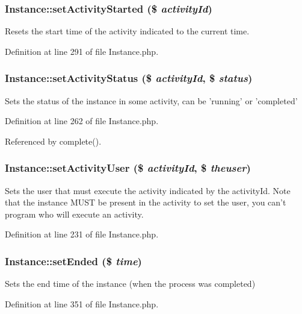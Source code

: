 \subsubsection{\setlength{\rightskip}{0pt plus 5cm}Instance::set\-Activity\-Started (\$ {\em activity\-Id})}\label{classInstance_a17}


Resets the start time of the activity indicated to the current time. 

Definition at line 291 of file Instance.php.
\subsubsection{\setlength{\rightskip}{0pt plus 5cm}Instance::set\-Activity\-Status (\$ {\em activity\-Id}, \$ {\em status})}\label{classInstance_a15}


Sets the status of the instance in some activity, can be 'running' or 'completed' 

Definition at line 262 of file Instance.php.

Referenced by complete().
\subsubsection{\setlength{\rightskip}{0pt plus 5cm}Instance::set\-Activity\-User (\$ {\em activity\-Id}, \$ {\em theuser})}\label{classInstance_a13}


Sets the user that must execute the activity indicated by the activity\-Id. Note that the instance MUST be present in the activity to set the user, you can't program who will execute an activity. 

Definition at line 231 of file Instance.php.
\subsubsection{\setlength{\rightskip}{0pt plus 5cm}Instance::set\-Ended (\$ {\em time})}\label{classInstance_a21}


Sets the end time of the instance (when the process was completed) 

Definition at line 351 of file Instance.php.
